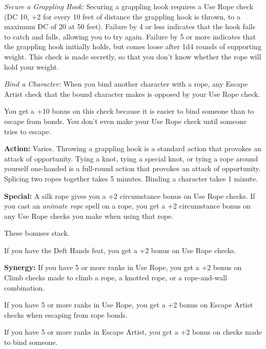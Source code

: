 \documentclass{article}
\begin{document}
\vspace{12pt}
\textit{Secure a Grappling Hook: }Securing a grappling hook requires a Use Rope 
check (DC 10, +2 for every 10 feet of distance the grappling hook is thrown, to 
a maximum DC of 20 at 50 feet). Failure by 4 or less indicates that the hook fails 
to catch and falls, allowing you to try again. Failure by 5 or more indicates that 
the grappling hook initially holds, but comes loose after 1d4 rounds of supporting 
weight. This check is made secretly, so that you don't know whether the rope will 
hold your weight.

\textit{Bind a Character: }When you bind another character with a rope, any Escape 
Artist check that the bound character makes is opposed by your Use Rope check.

You get a +10 bonus on this check because it is easier to bind someone than to 
escape from bonds. You don't even make your Use Rope check until someone tries 
to escape.

\textbf{Action:} Varies. Throwing a grappling hook is a standard action that provokes 
an attack of opportunity. Tying a knot, tying a special knot, or tying a rope around 
yourself one-handed is a full-round action that provokes an attack of opportunity. 
Splicing two ropes together takes 5 minutes. Binding a character takes 1 minute.

\textbf{Special:} A silk rope gives you a +2 circumstance bonus on Use Rope checks. 
If you cast an \textit{animate rope }spell on a rope, you get a +2 circumstance 
bonus on any Use Rope checks you make when using that rope.

These bonuses stack.

If you have the Deft Hands feat, you get a +2 bonus on Use Rope checks.

\textbf{Synergy:} If you have 5 or more ranks in Use Rope, you get a +2 bonus on 
Climb checks made to climb a rope, a knotted rope, or a rope-and-wall combination.

If you have 5 or more ranks in Use Rope, you get a +2 bonus on Escape Artist checks 
when escaping from rope bonds.

If you have 5 or more ranks in Escape Artist, you get a +2 bonus on checks made 
to bind someone.

\newpage
\end{document}
